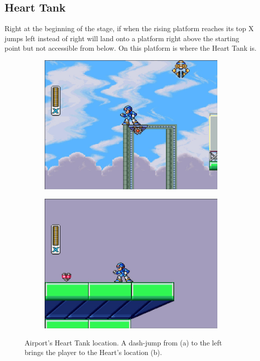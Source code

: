 \subsection{Heart Tank}
Right at the beginning of the stage, if when the rising platform reaches its top X jumps left instead of right will land onto a platform right above the starting point but not accessible from below. On this platform is where the Heart Tank is.
\begin{figure}[htp]
	\centering
	\begin{subfigure}{0.4\linewidth}
		\centering
		\includegraphics[width=\linewidth]{figures/X1/Storm_eagle/Storm_heart_1.jpg}
		\caption{}
	\end{subfigure}
	\begin{subfigure}{0.4\linewidth}
		\centering
		\includegraphics[width=\linewidth]{figures/X1/Storm_eagle/Storm_heart_2.jpg}
		\caption{}
	\end{subfigure}
	\caption{Airport's Heart Tank location. A dash-jump from (a) to the left brings the player to the Heart's location (b).}
\end{figure}

